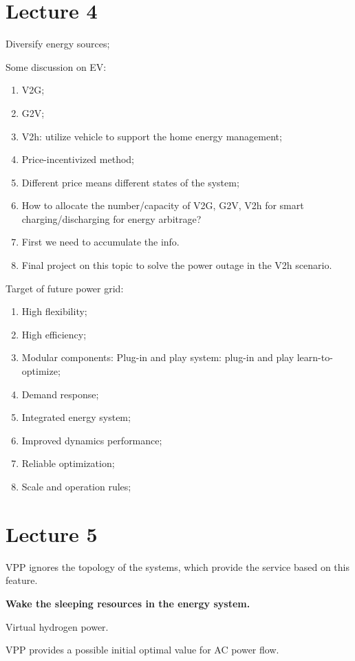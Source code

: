 \documentclass{article}
\newcommand{\slw}{\color{red}}
\begin{document}
\section{Lecture 4}

Diversify energy sources;

Some discussion on EV:
\begin{enumerate}
  \item V2G;
  \item G2V;
  \item {\slw V2h}: utilize vehicle to support the home energy management;
  \item Price-incentivized method;
  \item {\slw Different price means different states of the system};
  \item How to allocate the number/capacity of V2G, G2V, V2h for smart charging/discharging for energy arbitrage?
  \item First we need to accumulate the info.
  \item Final project on this topic to solve the power outage in the {\slw V2h} scenario. 
\end{enumerate}

Target of future power grid:
\begin{enumerate}
  \item High flexibility;
  \item High efficiency;
  \item Modular components: Plug-in and play system: {\slw plug-in and play learn-to-optimize};
  \item Demand response;
  \item Integrated energy system;
  \item Improved dynamics performance;
  \item Reliable optimization;
  \item Scale and operation rules;
\end{enumerate}

\section{Lecture 5}

VPP ignores the topology of the systems, which provide the service based on this feature.

\textbf{Wake the sleeping resources in the energy system.}

Virtual hydrogen power.

VPP provides a possible initial optimal value for AC power flow.
\end{document}
